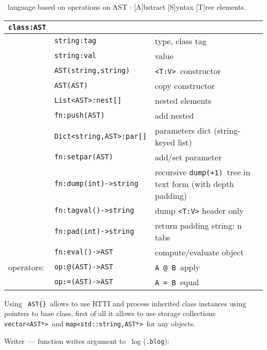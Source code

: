 \label{ast}\secdown

\bi\ language based on operations on AST :
[A]bstract [S]yntax [T]ree elements.

\bigskip
\begin{tabular}{l l l}
\verb|class:AST| &&\\
\hline
& \verb|string:tag| & type, class tag \\
& \verb|string:val| & value \\
\hline
& \verb|AST(string,string)| & \verb|<T:V>|\ constructor \\
& \verb|AST(AST)| & copy constructor \\
\hline
& \verb|List<AST>:nest[]| & nested elements \\
& \verb|fn:push(AST)| & add nested \\
\hline
& \verb|Dict<string,AST>:par[]| & parameters dict (string-keyed list) \\
& \verb|fn:setpar(AST)| & add/set parameter \\
\hline
& \verb|fn:dump(int)->string| & recursive \verb|dump(+1)|\ tree in text
form (with depth padding) \\
& \verb|fn:tagval()->string| & dump \verb|<T:V>| header only \\
& \verb|fn:pad(int)->string| & return padding string: n tabs \\
\hline
& \verb|fn:eval()->AST| & compute/evaluate object \\
operators: & \verb|op:@(AST)->AST| & \verb|A @ B|\ apply \\
& \verb|op:=(AST)->AST| & \verb|A = B|\ equal \\
\end{tabular} 


Using \ \verb|AST{}|\ allows to use RTTI and process
inherited class instances using pointers to base class, first of all it allows
to use storage collections \verb|vector<AST*>|\ and
\verb|map<std::string,AST*>|\ for any objects.  


Writer\ --- function writes argument to \bi\ log (\verb|.blog|):



\secup
